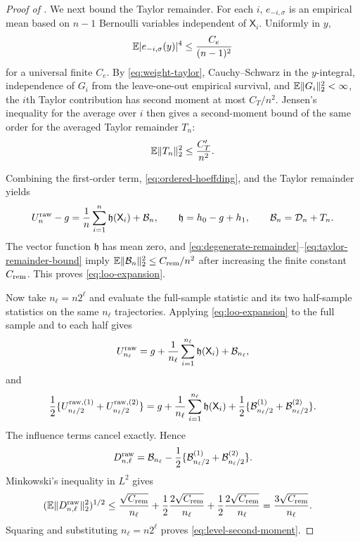 \begin{proof}[Proof of ]
We next bound the Taylor remainder.  For each $i$, $e_{-i,\sigma}$ is an empirical mean based on $n-1$ Bernoulli variables independent of $\mathsf X_i$.  Uniformly in $y$,
\begin{equation}\label{eq:bernoulli-fourth-moment}
 \mathbb E\lvert e_{-i,\sigma}(y)\rvert^4\le\frac{C_e}{(n-1)^2}
\end{equation}
for a universal finite $C_e$.  By \eqref{eq:weight-taylor}, Cauchy--Schwarz in the $y$-integral, independence of $G_i$ from the leave-one-out empirical survival, and $\mathbb E\lVert G_i\rVert_2^2<\infty$, the $i$th Taylor contribution has second moment at most $C_T/n^2$.  Jensen's inequality for the average over $i$ then gives a second-moment bound of the same order for the averaged Taylor remainder $T_n$:
\begin{equation}\label{eq:taylor-remainder-bound}
 \mathbb E\lVert T_n\rVert_2^2\le\frac{C_T'}{n^2}.
\end{equation}

Combining the first-order term, \eqref{eq:ordered-hoeffding}, and the Taylor remainder yields
\[
 U_n^{\rm raw}-g
 =\frac1n\sum_{i=1}^{n}\mathfrak h(\mathsf X_i)+\mathcal B_n,
 \qquad
 \mathfrak h=h_0-g+h_1,
 \qquad
 \mathcal B_n=\mathcal D_n+T_n.
\]
The vector function $\mathfrak h$ has mean zero, and \eqref{eq:degenerate-remainder}--\eqref{eq:taylor-remainder-bound} imply
$\mathbb E\lVert\mathcal B_n\rVert_2^2\le C_{\rm rem}/n^2$ after increasing the finite constant $C_{\rm rem}$.  This proves \eqref{eq:loo-expansion}.

Now take $n_\ell=n2^\ell$ and evaluate the full-sample statistic and its two half-sample statistics on the same $n_\ell$ trajectories.  Applying \eqref{eq:loo-expansion} to the full sample and to each half gives
\[
 U_{n_\ell}^{\rm raw}
 =g+\frac1{n_\ell}\sum_{i=1}^{n_\ell}\mathfrak h(\mathsf X_i)+\mathcal B_{n_\ell},
\]
and
\[
 \frac12\{U_{n_\ell/2}^{\rm raw,(1)}+U_{n_\ell/2}^{\rm raw,(2)}\}
 =g+\frac1{n_\ell}\sum_{i=1}^{n_\ell}\mathfrak h(\mathsf X_i)
 +\frac12\{\mathcal B_{n_\ell/2}^{(1)}+\mathcal B_{n_\ell/2}^{(2)}\}.
\]
The influence terms cancel exactly.  Hence
\[
 D_{n,\ell}^{\rm raw}
 =\mathcal B_{n_\ell}-\frac12\{\mathcal B_{n_\ell/2}^{(1)}+\mathcal B_{n_\ell/2}^{(2)}\}.
\]
Minkowski's inequality in $L^2$ gives
\begin{align*}
 (\mathbb E\lVert D_{n,\ell}^{\rm raw}\rVert_2^2)^{1/2}
 &\le\frac{\sqrt{C_{\rm rem}}}{n_\ell}
 +\frac12\frac{2\sqrt{C_{\rm rem}}}{n_\ell}
 +\frac12\frac{2\sqrt{C_{\rm rem}}}{n_\ell}
 =\frac{3\sqrt{C_{\rm rem}}}{n_\ell}.
\end{align*}
Squaring and substituting $n_\ell=n2^\ell$ proves \eqref{eq:level-second-moment}.


\end{proof}

